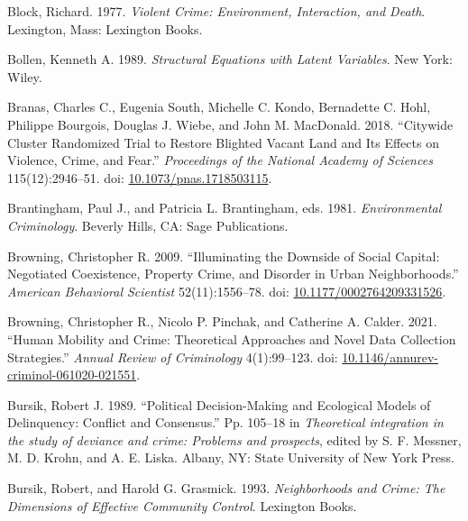 \documentclass [11pt, proquest] {uwthesis}[2015/03/03]
\newlength{\cslhangindent}
\newenvironment{CSLReferences}[2]%
{\setlength{\parindent}{0pt}%
\everypar{\setlength{\hangindent}{\cslhangindent}}\ignorespaces}%
{\par}
\begin{document}
\begin{CSLReferences}{1}{0}
\leavevmode\hypertarget{ref-blockViolentCrimeEnvironment1977}{}%
Block, Richard. 1977. \emph{Violent Crime: Environment, Interaction, and Death}. {Lexington, Mass}: {Lexington Books}.

\leavevmode\hypertarget{ref-bollenStructuralEquationsLatent1989}{}%
Bollen, Kenneth A. 1989. \emph{Structural Equations with Latent Variables}. {New York}: {Wiley}.

\leavevmode\hypertarget{ref-branasCitywideClusterRandomized2018}{}%
Branas, Charles C., Eugenia South, Michelle C. Kondo, Bernadette C. Hohl, Philippe Bourgois, Douglas J. Wiebe, and John M. MacDonald. 2018. {``Citywide {Cluster Randomized Trial} to {Restore Blighted Vacant Land} and Its {Effects} on {Violence}, {Crime}, and {Fear}.''} \emph{Proceedings of the National Academy of Sciences} 115(12):2946--51. doi: \href{https://doi.org/10.1073/pnas.1718503115}{10.1073/pnas.1718503115}.

\leavevmode\hypertarget{ref-brantinghamEnvironmentalCriminology1981}{}%
Brantingham, Paul J., and Patricia L. Brantingham, eds. 1981. \emph{Environmental {Criminology}}. {Beverly Hills, CA}: {Sage Publications}.

\leavevmode\hypertarget{ref-browningIlluminatingDownsideSocial2009}{}%
Browning, Christopher R. 2009. {``Illuminating the {Downside} of {Social Capital}: {Negotiated Coexistence}, {Property Crime}, and {Disorder} in {Urban Neighborhoods}.''} \emph{American Behavioral Scientist} 52(11):1556--78. doi: \href{https://doi.org/10.1177/0002764209331526}{10.1177/0002764209331526}.

\leavevmode\hypertarget{ref-browningHumanMobilityCrime2021}{}%
Browning, Christopher R., Nicolo P. Pinchak, and Catherine A. Calder. 2021. {``Human {Mobility} and {Crime}: {Theoretical Approaches} and {Novel Data Collection Strategies}.''} \emph{Annual Review of Criminology} 4(1):99--123. doi: \href{https://doi.org/10.1146/annurev-criminol-061020-021551}{10.1146/annurev-criminol-061020-021551}.

\leavevmode\hypertarget{ref-bursikPoliticalDecisionmakingEcological1989}{}%
Bursik, Robert J. 1989. {``Political Decision-Making and Ecological Models of Delinquency: {Conflict} and Consensus.''} Pp. 105--18 in \emph{Theoretical integration in the study of deviance and crime: {Problems} and prospects}, edited by S. F. Messner, M. D. Krohn, and A. E. Liska. {Albany, NY}: {State University of New York Press}.

\leavevmode\hypertarget{ref-bursikNeighborhoodsCrimeDimensions1993}{}%
Bursik, Robert, and Harold G. Grasmick. 1993. \emph{Neighborhoods and {Crime}: {The Dimensions} of {Effective Community Control}}. {Lexington Books}.


\end{CSLReferences}
\end{document}
